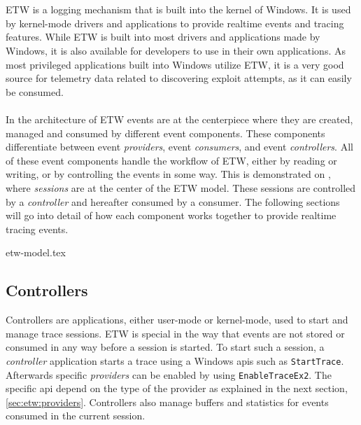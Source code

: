 \documentclass{report}
\begin{document}
\section{}
\label{cha:etw}
\gls{ETW} is a logging mechanism that is built into the kernel of Windows. It is used by kernel-mode drivers and applications to provide realtime events and tracing features. While \gls{ETW} is built into most drivers and applications made by Windows, it is also available for developers to use in their own applications. As most privileged applications built into Windows utilize \gls{ETW}, it is a very good source for telemetry data related to discovering exploit attempts, as it can easily be consumed.
\\
\\
In the architecture of \gls{ETW} events are at the centerpiece where they are created, managed and consumed by different event components\cite{url:etw:about}. These components differentiate between event \emph{providers}, event \emph{consumers}, and event \emph{controllers}. All of these event components handle the workflow of \gls{ETW}, either by reading or writing, or by controlling the events in some way. This is demonstrated on , where \emph{sessions} are at the center of the \gls{ETW} model. These sessions are controlled by a \emph{controller} and hereafter consumed by a consumer. The following sections will go into detail of how each component works together to provide realtime tracing events.

{etw-model.tex}

\subsection{Controllers}
Controllers are applications, either user-mode or kernel-mode, used to start and manage trace sessions. \gls{ETW} is special in the way that events are not stored or consumed in any way before a session is started. To start such a session, a \emph{controller} application starts a trace using a Windows \gls{api}s such as \texttt{StartTrace}. Afterwards specific \emph{providers} can be enabled by using \texttt{EnableTraceEx2}. The specific \gls{api} depend on the type of the provider as explained in the next section, \ref{sec:etw:providers}. Controllers also manage buffers and statistics for events consumed in the current session.
\end{document}

